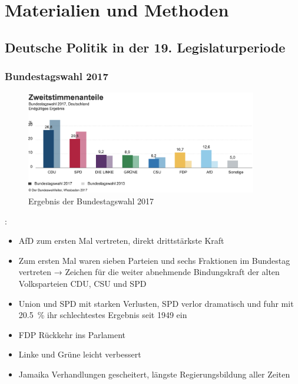 
\chapter{Materialien und Methoden} \label{ch:materialsAndMethods}



\section{Deutsche Politik in der 19. Legislaturperiode}

\subsection{Bundestagswahl \num{2017}}

\begin{figure}[H]
    \centering
    \includegraphics[width=0.9\textwidth]{data/images/ergebnisBtw17.png}
    \caption{Ergebnis der Bundestagswahl \num{2017} \autocite{noauthor_bundestagswahl_nodate}} \label{fig:ergebnisBtw17}
\end{figure}

\citeauthor{schmid_deutscher_2021} \autocite{schmid_deutscher_2021}:
\begin{itemize}
    \item AfD zum ersten Mal vertreten, direkt drittstärkste Kraft
    \item Zum ersten Mal waren sieben Parteien und sechs Fraktionen im Bundestag vertreten → Zeichen für die weiter abnehmende Bindungskraft der alten Volksparteien CDU, CSU und SPD
    \item Union und SPD mit starken Verlusten, SPD verlor dramatisch und fuhr mit \SI{20.5}{\percent} ihr schlechtestes Ergebnis seit \num{1949} ein
    \item FDP Rückkehr ins Parlament
    \item Linke und Grüne leicht verbessert
    \item Jamaika Verhandlungen gescheitert, längste Regierungsbildung aller Zeiten
\end{itemize}

